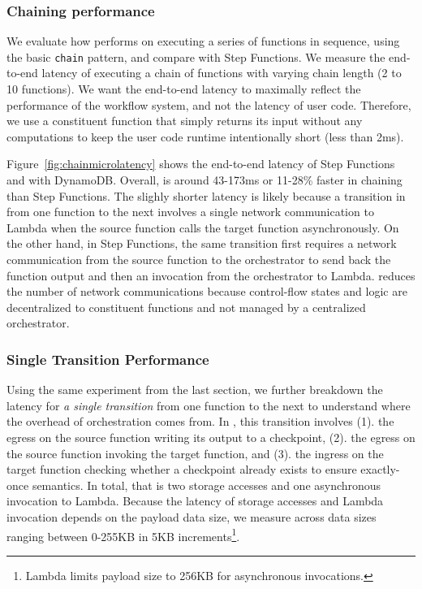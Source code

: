 \subsubsection{Chaining performance}\label{sec:eval:chain}

We evaluate how \name{} performs on executing a series of
functions in sequence, using the basic \texttt{chain} pattern, and compare with
Step Functions. We measure the end-to-end latency of executing a chain of
functions with varying chain length (2 to 10 functions). We want the
end-to-end latency to maximally reflect the performance of the workflow
system, and not the latency of user code. Therefore, we use a constituent 
function that simply returns its input without any computations to keep the
user code runtime intentionally short (less than 2ms).

Figure~\ref{fig:chainmicrolatency} shows the end-to-end latency of Step
Functions and \name{} with DynamoDB. Overall, \name{} is around 43-173ms or
11-28\% faster in chaining than Step Functions. The slighly shorter latency is
likely because a transition in \name{} from one function to the next involves
a single network communication to Lambda when the source function calls the
target function asynchronously. On the other hand, in Step Functions, the same
transition first requires a network communication from the source function to
the orchestrator to send back the function output and then an invocation from
the orchestrator to Lambda. \name{} reduces the number of network
communications because control-flow states and logic are decentralized to
constituent functions and not managed by a centralized orchestrator.

\subsubsection{Single Transition Performance}

Using the same experiment from the last section, we further breakdown the
latency for \emph{a single transition} from one function to the next to
understand where the overhead of orchestration comes from. In \name{}, this
transition involves (1). the egress on the source function writing its output
to a checkpoint, (2). the egress on the source function invoking the target
function, and (3). the ingress on the target function checking whether a
checkpoint already exists to ensure exactly-once semantics. In total, that is
two storage accesses and one asynchronous invocation to Lambda. Because the
latency of storage accesses and Lambda invocation depends on the payload data
size, we measure across data sizes ranging between 0-255KB in 5KB
increments\footnote{Lambda limits payload size to 256KB for asynchronous
	invocations.}.

